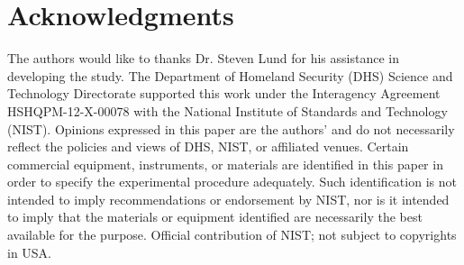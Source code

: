 \documentclass[fleqn,10pt,lineno]{wlpeerj}\usepackage[]{graphicx}\usepackage[]{color}
\begin{document}
\newpage

\section*{Acknowledgments}

The authors would like to thanks Dr. Steven Lund for his assistance in developing the study.
The Department of Homeland Security (DHS) Science and Technology Directorate supported this work under the Interagency Agreement HSHQPM-12-X-00078 with the National Institute of Standards and Technology (NIST).
Opinions expressed in this paper are the authors’ and do not necessarily reflect the policies and views of DHS,  NIST, or affiliated venues.
Certain commercial equipment, instruments, or materials are identified in this paper in order to specify the experimental procedure adequately.
Such identification is not intended to imply recommendations or endorsement by NIST,
nor is it intended to imply that the materials or equipment identified are necessarily the best available for the purpose.
Official contribution of NIST; not subject to copyrights in USA.


\end{document}

